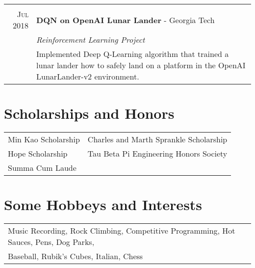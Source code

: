 \documentclass[a4paper,11pt]{article}
\begin{document}
\begin{tabularx}{\textwidth}{R|X}
    \\

   \textsc{Jul 2018} & \textbf{DQN on OpenAI Lunar Lander} \-- Georgia Tech\\
   & \emph{Reinforcement Learning Project}\\
   & \small{Implemented Deep Q-Learning algorithm that trained a lunar lander how to safely land on a platform in the OpenAI LunarLander-v2 environment.
   } \\
   

\end{tabularx}

\hfill
\section{Scholarships and Honors}
\begin{tabularx}{\textwidth}{XX}
   	Min Kao Scholarship & Charles and Marth Sprankle Scholarship \\
	Hope Scholarship & Tau Beta Pi Engineering Honors Society\\
	Summa Cum Laude
\end{tabularx}
\hfill
\section{Some Hobbeys and Interests}
\begin{tabularx}{\textwidth}{lX}
	Music Recording, Rock Climbing, Competitive Programming, Hot Sauces, Pens, Dog Parks, \\
	Baseball, Rubik's Cubes, Italian, Chess
\end{tabularx}
\end{document}
